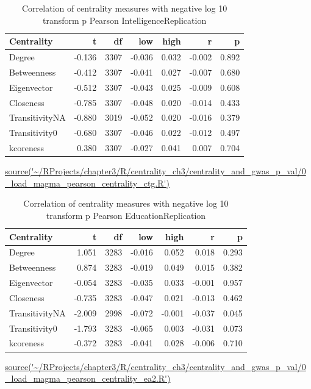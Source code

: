 \begin{table}[ht]
\centering
\begin{tabular}{lrrrrrr}
  \toprule
Centrality & t & df & low & high & r & p \\ 
  \midrule
Degree & -0.136 & 3307 & -0.036 & 0.032 & -0.002 & 0.892 \\ 
  Betweenness & -0.412 & 3307 & -0.041 & 0.027 & -0.007 & 0.680 \\ 
  Eigenvector & -0.512 & 3307 & -0.043 & 0.025 & -0.009 & 0.608 \\ 
  Closeness & -0.785 & 3307 & -0.048 & 0.020 & -0.014 & 0.433 \\ 
  TransitivityNA & -0.880 & 3019 & -0.052 & 0.020 & -0.016 & 0.379 \\ 
  Transitivity0 & -0.680 & 3307 & -0.046 & 0.022 & -0.012 & 0.497 \\ 
  kcoreness & 0.380 & 3307 & -0.027 & 0.041 & 0.007 & 0.704 \\ 
   \bottomrule
\end{tabular}
\caption{Correlation of centrality measures with negative log 10 transform p Pearson IntelligenceReplication} 
\tiny\url{source('~/RProjects/chapter3/R/centrality_ch3/centrality_and_gwas_p_val/0_load_magma_pearson_centrality_ctg.R')}
\label{tab:Correlation of centrality measures with negative log 10 transform p Pearson IntelligenceReplication}
\end{table}

\begin{table}[ht]
\centering
\begin{tabular}{lrrrrrr}
  \toprule
Centrality & t & df & low & high & r & p \\ 
  \midrule
Degree & 1.051 & 3283 & -0.016 & 0.052 & 0.018 & 0.293 \\ 
  Betweenness & 0.874 & 3283 & -0.019 & 0.049 & 0.015 & 0.382 \\ 
  Eigenvector & -0.054 & 3283 & -0.035 & 0.033 & -0.001 & 0.957 \\ 
  Closeness & -0.735 & 3283 & -0.047 & 0.021 & -0.013 & 0.462 \\ 
  TransitivityNA & -2.009 & 2998 & -0.072 & -0.001 & -0.037 & 0.045 \\ 
  Transitivity0 & -1.793 & 3283 & -0.065 & 0.003 & -0.031 & 0.073 \\ 
  kcoreness & -0.372 & 3283 & -0.041 & 0.028 & -0.006 & 0.710 \\ 
   \bottomrule
\end{tabular}
\caption{Correlation of centrality measures with negative log 10 transform p Pearson EducationReplication} 
\tiny\url{source('~/RProjects/chapter3/R/centrality_ch3/centrality_and_gwas_p_val/0_load_magma_pearson_centrality_ea2.R')}
\label{tab:Correlation of centrality measures with negative log 10 transform p Pearson EducationReplication}
\end{table}



